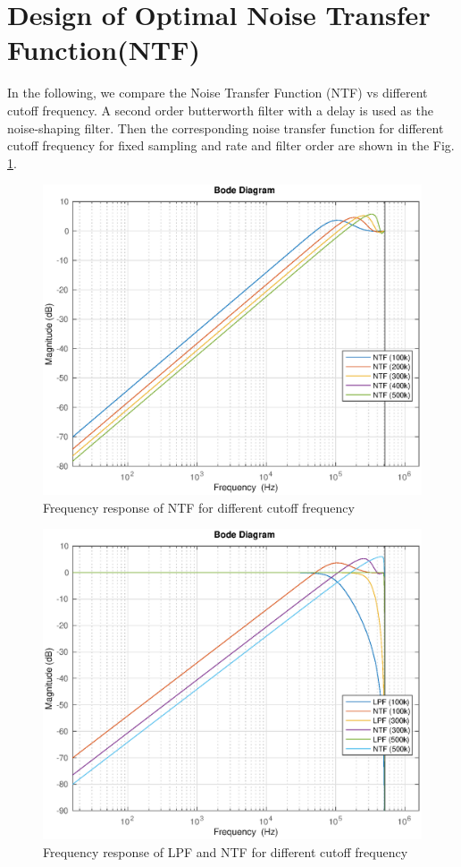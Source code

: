 \documentclass[a4paper]{article}
\begin{document}
\section{Design of Optimal Noise Transfer Function(NTF)}
In the following, we compare the Noise Transfer Function (NTF) vs different cutoff frequency. A second order butterworth filter with a delay is used as the noise-shaping filter. Then the corresponding noise transfer function for different cutoff frequency for fixed sampling and rate and filter order are shown in the Fig. \ref{fig:NTFvsfreq}. 

\begin{figure}[!h]
	\centering
	\includegraphics[scale = 0.7]{fig_stf_ntf/ntf_vs_freq.eps}
	\caption{Frequency response of NTF for different cutoff frequency}
	\label{fig:NTFvsfreq}
\end{figure}

\begin{figure}[!h]
	\centering
	\includegraphics[scale = 0.7]{fig_stf_ntf/lpf_ntf_vs_freq.eps}
	\caption{Frequency response of LPF and NTF for different cutoff frequency}
	\label{fig:LPF_NTFvsfreq}
\end{figure}
\end{document}
